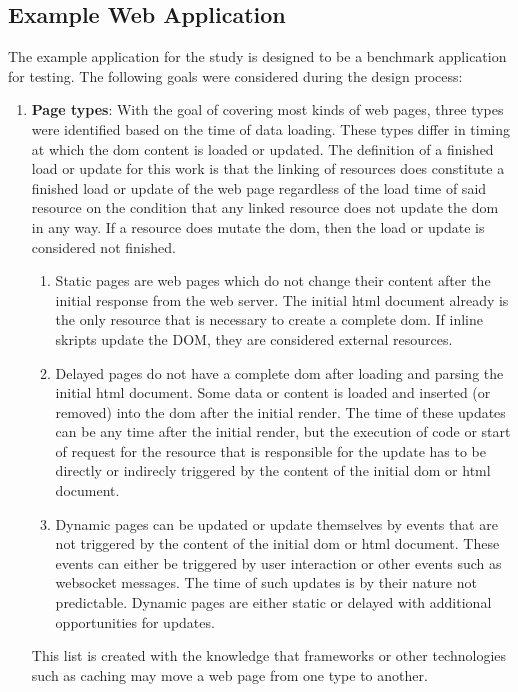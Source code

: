 \documentclass[a4paper, 12pt]{article}
\begin{document}
\subsection{Example Web Application}\label{subsec:exampleapplication}
%
% 

The example application for the study is designed to be a benchmark application for testing.
The following goals were considered during the design process:

\begin{enumerate}
  \item \textbf{Page types}: With the goal of covering most kinds of web pages, three types were identified based on the time of data loading.\label{enum:pagetypes}
  These types differ in timing at which the \acrshort{dom} content is loaded or updated.
  The definition of a finished load or update for this work is that the linking of resources does constitute a finished load or update of the web page regardless of the load time of said resource on the condition that any linked resource does not update the \acrshort{dom} in any way.
  If a resource does mutate the \acrshort{dom}, then the load or update is considered not finished.
  \begin{enumerate}
    \item Static pages are web pages which do not change their content after the initial response from the web server.
    The initial \acrshort{html} document already is the only resource that is necessary to create a complete \acrshort{dom}.
    If inline skripts update the DOM, they are considered external resources.
    \item Delayed pages do not have a complete \acrshort{dom} after loading and parsing the initial \acrshort{html} document.
    Some data or content is loaded and inserted (or removed) into the \acrshort{dom} after the initial render.
    The time of these updates can be any time after the initial render, but the execution of code or start of request for the resource that is responsible for the update has to be directly or indirecly triggered by the content of the initial \acrshort{dom} or \acrshort{html} document.
    \item Dynamic pages can be updated or update themselves by events that are not triggered by the content of the initial \acrshort{dom} or \acrshort{html} document.
    These events can either be triggered by user interaction or other events such as websocket messages.
    The time of such updates is by their nature not predictable.
    Dynamic pages are either static or delayed with additional opportunities for updates.
  \end{enumerate}
  This list is created with the knowledge that frameworks or other technologies such as caching may move a web page from one type to another.


\end{enumerate}
\end{document}
